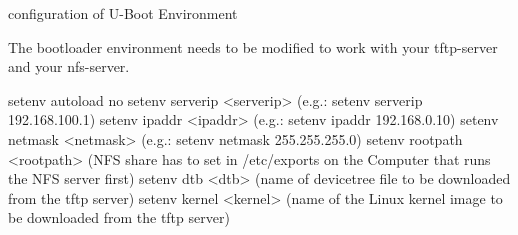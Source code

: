 
configuration of U-Boot Environment

The bootloader environment needs to be modified to work with your tftp-server and your nfs-server.

    setenv autoload no
    setenv serverip <serverip> (e.g.: setenv serverip 192.168.100.1)
    setenv ipaddr <ipaddr> (e.g.: setenv ipaddr 192.168.0.10)
    setenv netmask <netmask> (e.g.: setenv netmask 255.255.255.0)
    setenv rootpath <rootpath> (NFS share has to set in /etc/exports on the Computer that runs the NFS server first)
    setenv dtb <dtb> (name of devicetree file to be downloaded from the tftp server)
    setenv kernel <kernel> (name of the Linux kernel image to be downloaded from the tftp server)

